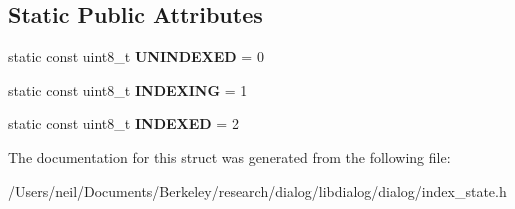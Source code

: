 \subsection*{Static Public Attributes}
\begin{DoxyCompactItemize}
\item 
\mbox{\label{structdialog_1_1index__state__t_a59650c8c90b9f1768b04a2768c059f3c}} 
static const uint8\+\_\+t {\bfseries U\+N\+I\+N\+D\+E\+X\+ED} = 0
\item 
\mbox{\label{structdialog_1_1index__state__t_a7d689f8e70cb67aa58da7cc74d5addc7}} 
static const uint8\+\_\+t {\bfseries I\+N\+D\+E\+X\+I\+NG} = 1
\item 
\mbox{\label{structdialog_1_1index__state__t_a22e470667ecade4e094302c534c3056b}} 
static const uint8\+\_\+t {\bfseries I\+N\+D\+E\+X\+ED} = 2
\end{DoxyCompactItemize}


The documentation for this struct was generated from the following file\+:\begin{DoxyCompactItemize}
\item 
/\+Users/neil/\+Documents/\+Berkeley/research/dialog/libdialog/dialog/index\+\_\+state.\+h\end{DoxyCompactItemize}
